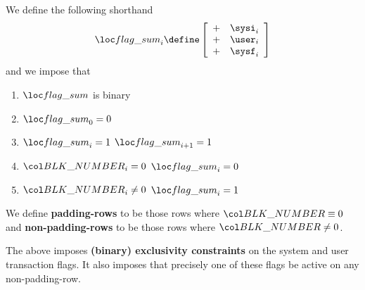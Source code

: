 We define the following shorthand
\[
	\flagSum _{i} \define
	\left[ \begin{array}{cl}
		+ & \sysi _{i} \\
		+ & \user _{i} \\
		+ & \sysf _{i} \\
	\end{array} \right]
\]
and we impose that
\begin{enumerate}
	\item $\flagSum$ is binary
	\item $\flagSum _{0} = 0$
	\item \If $\flagSum _{i} = 1$ \Then $\flagSum _{i + 1} = 1$
	\item \If $\blockNumber _{i} =    0$ \Then $\flagSum _{i} = 0$
	\item \If $\blockNumber _{i} \neq 0$ \Then $\flagSum _{i} = 1$
\end{enumerate}
\saNote{} \label{hub: system: padding row definition}
We define \textbf{padding-rows} to be those rows where $\blockNumber \equiv 0$ and
\textbf{non-padding-rows} to be those rows where $\blockNumber \neq 0$.

\saNote{} \label{hub: system: exclusivity of the system and user transaction flags}
The above imposes \textbf{(binary) exclusivity constraints} on the system and user transaction flags.
It also imposes that precisely one of these flags be active on any non-padding-row.
